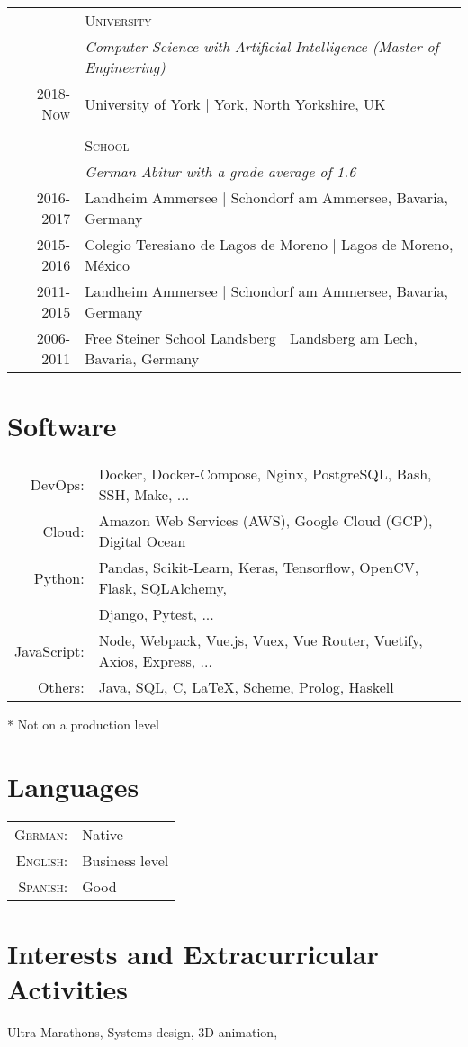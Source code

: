 \documentclass[a4paper,10pt]{article}
\begin{document}
\begin{tabular}{r|p{11cm}}

                    & \textsc{University} \\
                    & \emph{Computer Science with Artificial Intelligence (Master of Engineering)} \\
\textsc{2018-Now}  & University of York | York, North Yorkshire, UK \\
\multicolumn{2}{c}{}\\
                    & \textsc{School} \\
                    & \emph{German \emph{Abitur} with a grade average of 1.6} \\
\textsc{2016-2017}  & Landheim Ammersee | Schondorf am Ammersee, Bavaria, Germany \\
\textsc{2015-2016}  & Colegio Teresiano de Lagos de Moreno |  Lagos de Moreno, México \\
\textsc{2011-2015}  & Landheim Ammersee | Schondorf am Ammersee, Bavaria, Germany \\
\textsc{2006-2011}  & Free Steiner School Landsberg | Landsberg am Lech, Bavaria, Germany \\

\end{tabular}


\section{Software}
\renewcommand{\thefootnote}{*}
\begin{threeparttable}
\begin{tabular}{rl}
    DevOps:     & Docker, Docker-Compose, Nginx, PostgreSQL, Bash, SSH, Make, ... \\
    Cloud:      & Amazon Web Services (AWS), Google Cloud (GCP), Digital Ocean
    \vspace{2mm} \\
    Python:     & Pandas, Scikit-Learn, Keras, Tensorflow, OpenCV, Flask, SQLAlchemy, \\
                & Django, Pytest, ... \\
    JavaScript: & Node, Webpack, Vue.js, Vuex, Vue Router, Vuetify, Axios, Express, ... \\
    Others:     & Java, SQL, C, \LaTeX, Scheme\footnotemark, Prolog\footnotemark, Haskell\footnotemark
\end{tabular}
\begin{tablenotes}
    \small\item[*] Not on a production level
  \end{tablenotes}
\end{threeparttable}

\section{Languages}
\begin{tabular}{rl}
\textsc{German:}  & Native \\
\textsc{English:} & Business level \\
\textsc{Spanish:} & Good \\
\end{tabular}

\section{Interests and Extracurricular Activities }
Ultra-Marathons, Systems design, 3D animation,
\end{document}
